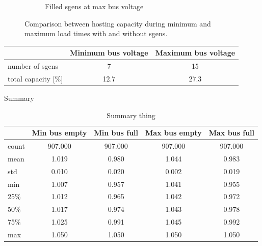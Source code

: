 \documentclass[a4paper,10pt]{report}
\begin{document}
\begin{figure}
\begin{subfigure}[b]{0.475\textwidth}
		\caption[]%
		{{\small Filled sgens at max bus voltage}}    
		\label{fig:mean and std of net44}
	\end{subfigure}
	\caption[Comparison of hosting capacities for time extremes]
	{\small Comparison between hosting capacity during minimum and maximum load times with and without sgens.} 
	\label{fig:mean and std of nets}
\end{figure}

\begin{table}[htpb]
	\centering
	\begin{tabular}{lcc}
		\toprule
		& Minimum bus voltage & Maximum bus voltage \\
		\midrule
		number of sgens & 7 & 15 \\
		total capacity [\%] & 12.7 & 27.3 \\
		\bottomrule
	\end{tabular}
	\label{hosting_cap_stats}
\end{table}

Summary
\begin{table}[htpb]
	\centering
	\begin{tabular}{lcccc}
		\toprule
		& Min bus empty & Min bus full & Max bus empty & Max bus full \\
		\midrule
		count & 907.000 & 907.000 & 907.000 & 907.000 \\
		mean & 1.019 & 0.980 & 1.044 & 0.983 \\
		std & 0.010 & 0.020 & 0.002 & 0.019 \\
		min & 1.007 & 0.957 & 1.041 & 0.955 \\
		25\% & 1.012 & 0.965 & 1.042 & 0.972 \\
		50\% & 1.017 & 0.974 & 1.043 & 0.978 \\
		75\% & 1.025 & 0.991 & 1.045 & 0.992 \\
		max & 1.050 & 1.050 & 1.050 & 1.050 \\
		\bottomrule
	\end{tabular}
	\caption{Summary thing}
	\label{extremes_summary}
\end{table}
\end{document}
